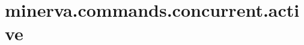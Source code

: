 \section{minerva.commands.concurrent.active}
\label{configuration:MinervaCommandsConcurrentActive}
\TODO
